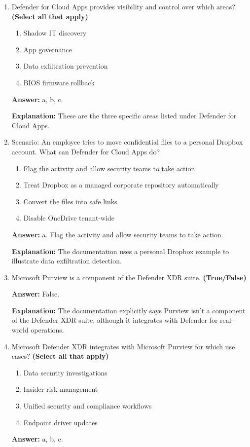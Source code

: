 \documentclass[10pt]{article}
\begin{document}
\begin{enumerate}[leftmargin=*]
\item Defender for Cloud Apps provides visibility and control over which areas? \textbf{(Select all that apply)}
\begin{enumerate}[label=\alph*., leftmargin=1.5em]
\item Shadow IT discovery
\item App governance
\item Data exfiltration prevention
\item BIOS firmware rollback
\end{enumerate}
\textbf{Answer:} a, b, c.

\textbf{Explanation:} These are the three specific areas listed under Defender for Cloud Apps.

\item Scenario: An employee tries to move confidential files to a personal Dropbox account. What can Defender for Cloud Apps do?
\begin{enumerate}[label=\alph*., leftmargin=1.5em]
\item Flag the activity and allow security teams to take action
\item Treat Dropbox as a managed corporate repository automatically
\item Convert the files into safe links
\item Disable OneDrive tenant-wide
\end{enumerate}
\textbf{Answer:} a. Flag the activity and allow security teams to take action.

\textbf{Explanation:} The documentation uses a personal Dropbox example to illustrate data exfiltration detection.

\item Microsoft Purview is a component of the Defender XDR suite. \textbf{(True/False)}

\textbf{Answer:} False.

\textbf{Explanation:} The documentation explicitly says Purview isn’t a component of the Defender XDR suite, although it integrates with Defender for real-world operations.

\item Microsoft Defender XDR integrates with Microsoft Purview for which use cases? \textbf{(Select all that apply)}
\begin{enumerate}[label=\alph*., leftmargin=1.5em]
\item Data security investigations
\item Insider risk management
\item Unified security and compliance workflows
\item Endpoint driver updates
\end{enumerate}
\textbf{Answer:} a, b, c.


\end{enumerate}
\end{document}
